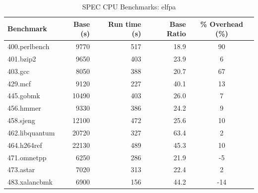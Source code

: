 \documentclass[twoside,12pt]{cslreport}
\begin{document}
\begin{table}
\begin{center}
\begin{tabular}{|l|r|r|r|c|}
\hline
Benchmark  & Base  (s)  & Run time (s) &  Base Ratio & \% Overhead (\%)\\
\hline
400.perlbench    & 9770        & 517       & 18.9 & 90 \\
401.bzip2        & 9650        & 403       & 23.9 & 6  \\
403.gcc          & 8050        & 388       & 20.7 & 67 \\
429.mcf          & 9120        & 227       & 40.1 & 13 \\
445.gobmk      &  10490        & 403       & 26.0 & 7  \\
456.hmmer        & 9330        & 386       & 24.2 & 9  \\
458.sjeng       & 12100        & 472       & 25.6 & 10 \\
462.libquantum  & 20720        & 327       & 63.4 & 2  \\
464.h264ref     & 22130        & 489       & 45.3 & 10 \\
471.omnetpp      & 6250        & 286       & 21.9 & -5 \\
473.astar        & 7020        & 313       & 22.4 & 2  \\
483.xalancbmk    & 6900        & 156       & 44.2 & -14 \\
\hline
\end{tabular}
\end{center}
\caption{SPEC CPU Benchmarks: elfpa}
\label{elfpa:spec}
\end{table}

\end{document}
